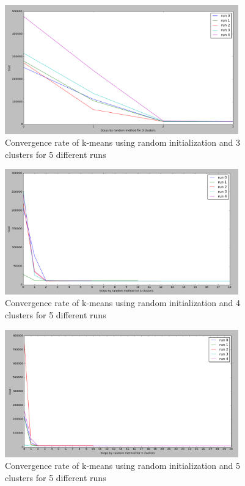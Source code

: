 \begin{figure}[!htb]
\centering
\includegraphics[width=0.9\textwidth]{shots/random3clusters.png}
\caption{ Convergence rate of k-means using random initialization and 3 clusters for 5 different runs }
\label{random3clusters}
\end{figure}

\begin{figure}[!htb]
\centering
\includegraphics[width=0.9\textwidth]{shots/random4clusters.png}
\caption{ Convergence rate of k-means using random initialization and 4 clusters for 5 different runs }
\label{random4clusters}
\end{figure}

\begin{figure}[!htb]
\centering
\includegraphics[width=0.9\textwidth]{shots/random5clusters.png}
\caption{ Convergence rate of k-means using random initialization and 5 clusters for 5 different runs  }
\label{random5clusters}
\end{figure}

